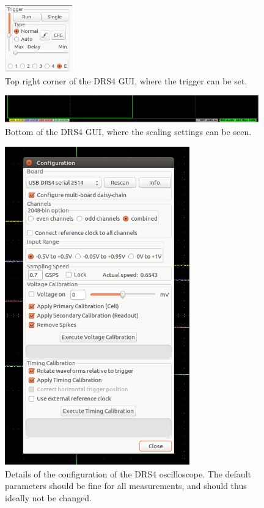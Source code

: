 \documentclass[12pt]{article}
\begin{document}
\begin{figure}[H]
    \centering
    \includegraphics[width = 3cm]{pics/DRS_oscilloscope_settings_details_top_right.png}
    \caption{\small Top right corner of the DRS4 GUI, where the trigger can be set.}
    \label{fig:DRS_oscilloscope_settings_details_top_right}
\end{figure}
\begin{figure}[H]
    \centering
    \includegraphics[width = 11cm]{pics/DRS_oscilloscope_settings_details_scaling.png}
    \caption{\small Bottom of the DRS4 GUI, where the scaling settings can be seen.}
    \label{fig:DRS_oscilloscope_settings_details_scaling}
\end{figure}
\begin{figure}[H]
    \centering
    \includegraphics[width = 8cm]{pics/DRS_oscilloscope_settings_configuration.png}
    \caption{\small Details of the configuration of the DRS4 oscilloscope. The default parameters should be fine for all measurements, and should thus ideally not be changed.}
    \label{fig:DRS_oscilloscope_settings_configuration}
\end{figure}
\end{document}
